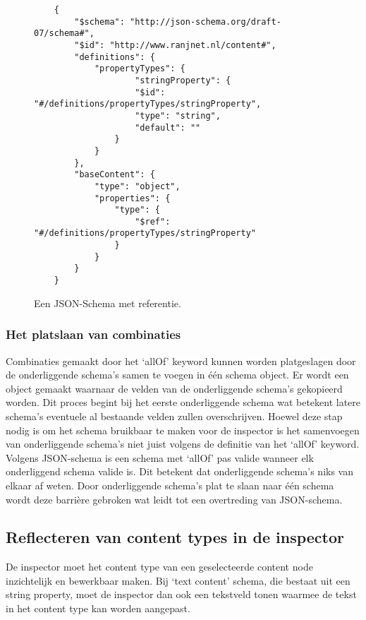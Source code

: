 \begin{figure}[htb]
    \centering
    \lstset{language=JSON}
    \begin{lstlisting}
    {
        "$schema": "http://json-schema.org/draft-07/schema#",
        "$id": "http://www.ranjnet.nl/content#",
        "definitions": {
            "propertyTypes": {
                    "stringProperty": {
                    "$id": "#/definitions/propertyTypes/stringProperty",
                    "type": "string",
                    "default": ""
                }
            }
        },
        "baseContent": {
            "type": "object",
            "properties": {
                "type": {
                    "$ref": "#/definitions/propertyTypes/stringProperty"
                }
            }
        }
    }          
    \end{lstlisting}
    \caption{Een JSON-Schema met referentie.}
    \label{fig:jsonschemrefexample}
\end{figure}


\subsubsection{Het platslaan van combinaties}
Combinaties gemaakt door het ‘allOf’ keyword kunnen worden platgeslagen door de onderliggende schema’s samen te voegen in één schema object. Er wordt een object gemaakt waarnaar de velden van de onderliggende schema’s gekopieerd worden. Dit proces begint bij het eerste onderliggende schema wat betekent latere schema’s eventuele al bestaande velden zullen overschrijven.
Hoewel deze stap nodig is om het schema bruikbaar te maken voor de inspector is het samenvoegen van onderliggende schema’s niet juist volgens de definitie van het ‘allOf’ keyword. Volgens JSON-schema is een schema met ‘allOf’ pas valide wanneer elk onderliggend schema valide is\cite{FoundationsJSONSchema}. Dit betekent dat onderliggende schema’s niks van elkaar af weten. Door onderliggende schema’s plat te slaan naar één schema wordt deze barrière gebroken wat leidt tot een overtreding van JSON-schema.

\pagebreak
\subsection{Reflecteren van content types in de inspector}
De inspector moet het content type van een geselecteerde content node inzichtelijk en bewerkbaar maken. Bij ‘text content’ schema, die bestaat uit een string property, moet de inspector dan ook een tekstveld tonen waarmee de tekst in het content type kan worden aangepast.
